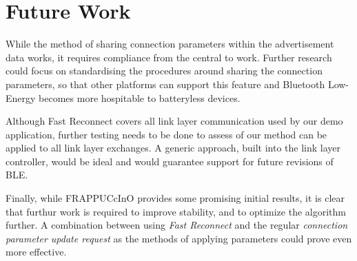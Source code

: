 \chapter{Future Work}
\label{chp:futurework}

While the method of sharing connection parameters within the advertisement data works, it requires compliance from the central to work. Further research could focus on standardising the procedures around sharing the connection parameters, so that other platforms can support this feature and Bluetooth Low-Energy becomes more hospitable to batteryless devices.

Although Fast Reconnect covers all link layer communication used by our demo application, further testing needs to be done to assess of our method can be applied to all link layer exchanges. A generic approach, built into the link layer controller, would be ideal and would guarantee support for future revisions of BLE.

Finally, while FRAPPUCcInO provides some promising initial results, it is clear that furthur work is required to improve stability, and to optimize the algorithm further. A combination between using \textit{Fast Reconnect} and the regular \textit{connection parameter update request} as the methods of applying parameters could prove even more effective.